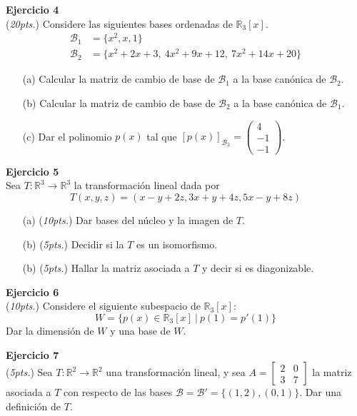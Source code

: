 \documentclass{article}
\newenvironment{problem}[2][Ejercicio]
    { \begin{mdframed}[backgroundcolor=gray!20] \textbf{#1 #2} \\}
    {  \end{mdframed}}
\begin{document}
\begin{problem}{4}
    (\textit{20pts.}) Considere las siguientes bases ordenadas de $\mathbb{R}_3[x]$.
    \begin{align*}
        \mathcal{B}_1 &= \{ x^2,x,1 \} \\
        \mathcal{B}_2 &= \{ x^2+2x+3, \ 4x^2+9x+12, \ 7x^2+14x+20 \}
    \end{align*}
    \begin{enumerate}
        \item[(a)] Calcular la matriz de cambio de base de $\mathcal{B}_1$ a la base canónica de $\mathcal{B}_2$.
        \item[(b)] Calcular la matriz de cambio de base de $\mathcal{B}_2$ a la base canónica de $\mathcal{B}_1$.
        \item[(c)] Dar el polinomio $p(x)$ tal que $[p(x)]_{\mathcal{B}_2} = \begin{pmatrix} 4 \\ -1 \\ -1 \end{pmatrix}$.
    \end{enumerate}
\end{problem}

\begin{problem}{5}
    Sea $T:\mathbb{R}^3 \to \mathbb{R}^3$ la transformación lineal dada por
    $$
    T(x,y,z) = (x-y+2z, 3x+y+4z, 5x-y+8z)
    $$
    \begin{enumerate}
        \item[(a)] (\textit{10pts.}) Dar bases del núcleo y la imagen de $T$.
        \item[(b)] (\textit{5pts.}) Decidir si la $T$ es un isomorfismo.
        \item[(b)] (\textit{5pts.}) Hallar la matriz asociada a $T$ y decir si es diagonizable.
    \end{enumerate}
\end{problem}

\begin{problem}{6}
    (\textit{10pts.}) Considere el siguiente subespacio de $\mathbb{R}_3[x]$:
    $$
    W = \{ p(x) \in \mathbb{R}_3[x] \ | \ p(1) = p'(1) \}
    $$
    Dar la dimensión de $W$ y una base de $W$.
\end{problem}

\begin{problem}{7}
    (\textit{5pts.}) Sea $T:\mathbb{R}^2 \to \mathbb{R}^2$ una transformación lineal, y sea $A=\begin{bmatrix} 2 & 0 \\ 3 & 7 \end{bmatrix}$ la matriz asociada a $T$ con respecto de las bases $\mathcal{B}=\mathcal{B'}= \{(1,2),(0,1) \}$. Dar una definición de $T$.
\end{problem}

\end{document}
